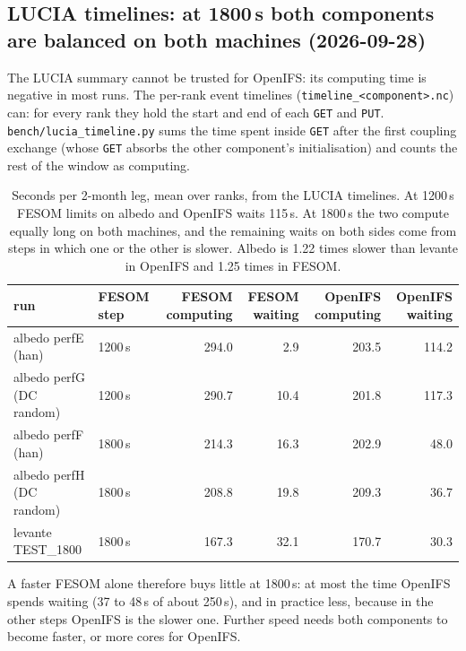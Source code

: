 \documentclass[11pt,a4paper]{article}
\begin{document}
\subsection{LUCIA timelines: at 1800\,s both components are balanced on both machines (2026-09-28)}
The LUCIA summary cannot be trusted for OpenIFS: its computing time is negative in most runs. The per-rank event timelines (\texttt{timeline\_<component>.nc}) can: for every rank they hold the start and end of each \texttt{GET} and \texttt{PUT}. \texttt{bench/lucia\_timeline.py} sums the time spent inside \texttt{GET} after the first coupling exchange (whose \texttt{GET} absorbs the other component's initialisation) and counts the rest of the window as computing.
\begin{table}[H]\centering\small
\begin{tabular}{llrrrr}\toprule
run & FESOM step & FESOM computing & FESOM waiting & OpenIFS computing & OpenIFS waiting\\\midrule
albedo perfE (han) & 1200\,s & 294.0 & 2.9 & 203.5 & 114.2\\
albedo perfG (DC random) & 1200\,s & 290.7 & 10.4 & 201.8 & 117.3\\
albedo perfF (han) & 1800\,s & 214.3 & 16.3 & 202.9 & 48.0\\
albedo perfH (DC random) & 1800\,s & 208.8 & 19.8 & 209.3 & 36.7\\
levante TEST\_1800 & 1800\,s & 167.3 & 32.1 & 170.7 & 30.3\\\bottomrule
\end{tabular}
\caption{Seconds per 2-month leg, mean over ranks, from the LUCIA timelines. At 1200\,s FESOM limits on albedo and OpenIFS waits 115\,s. At 1800\,s the two compute equally long on both machines, and the remaining waits on both sides come from steps in which one or the other is slower. Albedo is 1.22 times slower than levante in OpenIFS and 1.25 times in FESOM.}\label{tab:lucia_tl}
\end{table}
A faster FESOM alone therefore buys little at 1800\,s: at most the time OpenIFS spends waiting (37 to 48\,s of about 250\,s), and in practice less, because in the other steps OpenIFS is the slower one. Further speed needs both components to become faster, or more cores for OpenIFS.
\end{document}
